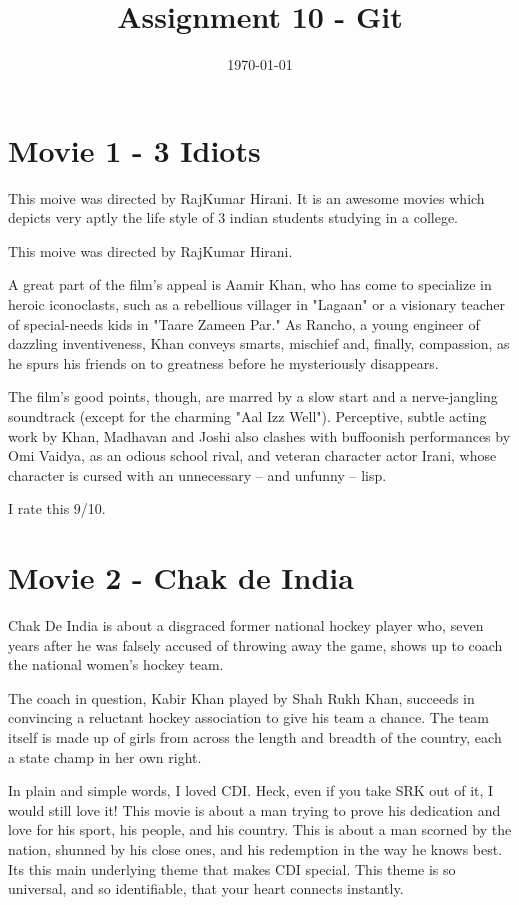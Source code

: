 \documentclass[]{article}
\title{Assignment 10 - Git}
\date{\today}
\begin{document}
\maketitle
\section{Movie 1 - 3 Idiots}
This moive was directed by RajKumar Hirani. It is an awesome movies which depicts very aptly the life style of 3 indian students studying in a college.

This moive was directed by RajKumar Hirani.

A great part of the film's appeal is Aamir Khan, who has come to specialize in heroic iconoclasts, such as a rebellious villager in "Lagaan" or a visionary teacher of special-needs kids in "Taare Zameen Par." As Rancho, a young engineer of dazzling inventiveness, Khan conveys smarts, mischief and, finally, compassion, as he spurs his friends on to greatness before he mysteriously disappears.

The film's good points, though, are marred by a slow start and a nerve-jangling soundtrack (except for the charming "Aal Izz Well"). Perceptive, subtle acting work by Khan, Madhavan and Joshi also clashes with buffoonish performances by Omi Vaidya, as an odious school rival, and veteran character actor Irani, whose character is cursed with an unnecessary -- and unfunny -- lisp.

I rate this 9/10.


\section{Movie 2 - Chak de India}
Chak De India is about a disgraced former national hockey player who, seven years after he was falsely accused of throwing away the game, shows up to coach the national women’s hockey team.

The coach in question, Kabir Khan played by Shah Rukh Khan, succeeds in convincing a reluctant hockey association to give his team a chance. The team itself is made up of girls from across the length and breadth of the country, each a state champ in her own right. 

In plain and simple words, I loved CDI. Heck, even if you take SRK out of it, I would still love it! This movie is about a man trying to prove his dedication and love for his sport, his people, and his country. This is about a man scorned by the nation, shunned by his close ones, and his redemption in the way he knows best. Its this main underlying theme that makes CDI special. This theme is so universal, and so identifiable, that your heart connects instantly.
\end{document}
